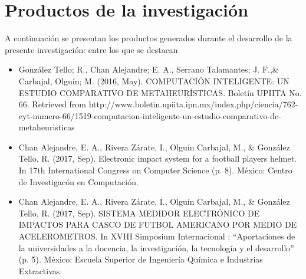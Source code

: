 \section{Productos de la investigaci\'{o}n}
A continuaci\'{o}n  se presentan los productos generados durante el
 desarrollo de la presente investigaci\'{o}n: entre los que se destacan
\begin{itemize}

\item {Gonz\'alez Tello; R., Chan Alejandre; E. A., Serrano Talamantes; J. 
 F.,\& Carbajal, Olgu\'in; M. (2016, May). COMPUTACI\'ON INTELIGENTE: UN 
 ESTUDIO COMPARATIVO DE METAHEUR\'ISTICAS. Bolet\'in UPIITA No. 66. Retrieved 
 from http://www.boletin.upiita.ipn.mx/index.php/ciencia/762-cyt-numero-66/1519-computacion-inteligente-un-estudio-comparativo-de-metaheuristicas}

\item {Chan Alejandre, E. A., Rivera Z\'arate, I., Olgu\'in Carbajal, M., \&
 Gonz\'alez Tello, R. (2017, Sep). Electronic impact system for a football 
 player\textsc{}s helmet. In 17th International Congress on Computer 
 Science (p. 8). M\'exico: Centro de Investigac\'on en Computaci\'on.}

\item {Chan Alejandre, E. A., Rivera Z\'arate, I., Olgu\'in Carbajal, M., \& 
 Gonz\'alez Tello, R. (2017, Sep). SISTEMA MEDIDOR ELECTR\'ONICO DE IMPACTOS 
 PARA CASCO DE FUTBOL AMERICANO POR MEDIO DE ACELEROMETROS. In XVIII 
 Simposium Internacional : ``Aportaciones de la universidades a la docencia, 
 la investigaci\'on, la tecnolog\'ia y el desarrollo'' (p. 5). M\'exico: 
 Escuela Superior de Ingenier\'ia Qu\'imica e Industrias Extractivas.}
 
\end{itemize}
